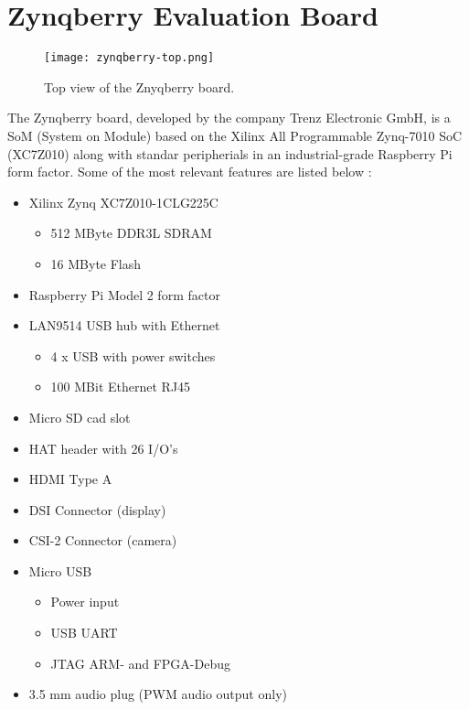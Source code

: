 
\chapter{Zynqberry Evaluation Board}

\begin{figure}
	\centering
	\texttt{[image: zynqberry-top.png]}
	\caption{Top view of the Znyqberry board.} \label{fig:znyqtop}
\end{figure}

The Zynqberry board, developed by the company Trenz Electronic GmbH, is a SoM (System on Module) based on the Xilinx All Programmable Zynq-7010 SoC (XC7Z010) along with standar peripherials in an industrial-grade Raspberry Pi form factor. Some of the most relevant features are listed below \cite{zynq-main}:

\begin{itemize}
	\item Xilinx Zynq XC7Z010-1CLG225C
	\begin{itemize}
		\item 512 MByte DDR3L SDRAM
		\item 16 MByte Flash
	\end{itemize}
	\item Raspberry Pi Model 2 form factor
	\item LAN9514 USB hub with Ethernet
	\begin{itemize}
		\item 4 x USB with power switches
		\item 100 MBit Ethernet RJ45
	\end{itemize}
	\item Micro SD cad slot
	\item HAT header with 26 I/O's
	\item HDMI Type A
	\item DSI Connector (display)
	\item CSI-2 Connector (camera)
	\item Micro USB
	\begin{itemize}
		\item Power input
		\item USB UART
		\item JTAG ARM- and FPGA-Debug
	\end{itemize}
	\item 3.5 mm audio plug (PWM audio output only)
\end{itemize}

